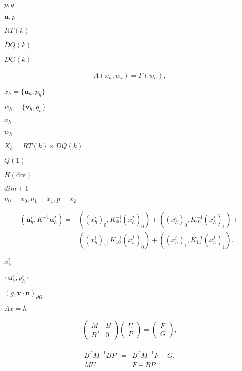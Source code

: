 \documentclass{article}
\begin{document}
$p,q$
\pagebreak

${\mathbf u},p$
\pagebreak

$RT(k)$
\pagebreak

$DQ(k)$
\pagebreak

$DG(k)$
\pagebreak

\begin{eqnarray*} A(x_h,w_h) = F(w_h), \end{eqnarray*}
\pagebreak

$x_h=\{{\mathbf u}_h,p_h\}$
\pagebreak

$w_h=\{{\mathbf v}_h,q_h\}$
\pagebreak

$x_h$
\pagebreak

$w_h$
\pagebreak

$X_h=RT(k)\times DQ(k)$
\pagebreak

$Q(1)$
\pagebreak

$H({\textrm{div}})$
\pagebreak

$dim+1$
\pagebreak

$u_0=x_0, u_1=x_1, p=x_2$
\pagebreak

\begin{eqnarray*} ({\mathbf u}_h^i, K^{-1}{\mathbf u}_h^j) = &\left((x_h^i)_0, K^{-1}_{00} (x_h^j)_0\right) + \left((x_h^i)_0, K^{-1}_{01} (x_h^j)_1\right) + \\ &\left((x_h^i)_1, K^{-1}_{10} (x_h^j)_0\right) + \left((x_h^i)_1, K^{-1}_{11} (x_h^j)_1\right). \end{eqnarray*}
\pagebreak

$x_h^i$
\pagebreak

$\{{\mathbf u}_h^i,p_h^i\}$
\pagebreak

$(g,{\mathbf v}\cdot {\mathbf n})_{\partial\Omega}$
\pagebreak

$Ax=h$
\pagebreak

\begin{eqnarray*} \left(\begin{array}{cc} M & B \\ B^T & 0 \end{array}\right) \left(\begin{array}{cc} U \\ P \end{array}\right) = \left(\begin{array}{cc} F \\ G \end{array}\right), \end{eqnarray*}
\pagebreak

\begin{eqnarray*} B^TM^{-1}B P &=& B^TM^{-1} F - G, \\ MU &=& F - BP. \end{eqnarray*}
\pagebreak
\end{document}
